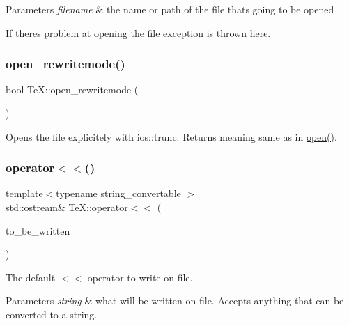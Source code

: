 \begin{DoxyParams}{Parameters}
{\em filename} & the name or path of the file that\textquotesingle{}s going to be opened\\
\hline
\end{DoxyParams}
If there\textquotesingle{}s problem at opening the file exception is thrown here. \mbox{\label{class_te_x_abcc58201c7ea70c660e22aa633be2c3a}} 
\subsubsection{\texorpdfstring{open\+\_\+rewritemode()}{open\_rewritemode()}}
{\footnotesize\ttfamily bool Te\+X\+::open\+\_\+rewritemode (\begin{DoxyParamCaption}{ }\end{DoxyParamCaption})}

Opens the file explicitely with ios\+::trunc. Returns meaning same as in \hyperlink{class_te_x_a742040deabcc5e71e314a3e3cf7deaa6}{open()}. \mbox{\label{class_te_x_ad82a6fa685379180ba717d341295b89c}} 
\subsubsection{\texorpdfstring{operator$<$$<$()}{operator<<()}}
{\footnotesize\ttfamily template$<$typename string\+\_\+convertable $>$ \\
std\+::ostream\& Te\+X\+::operator$<$$<$ (\begin{DoxyParamCaption}\item[{const string\+\_\+convertable}]{to\+\_\+be\+\_\+written }\end{DoxyParamCaption})\hspace{0.3cm}{\ttfamily [inline]}}

The default $<$$<$ operator to write on file. 
\begin{DoxyParams}{Parameters}
{\em string} & what will be written on file. Accepts anything that can be converted to a string. \\
\hline
\end{DoxyParams}
\mbox{\label{class_te_x_a788c3b484fdcc4797915044b9c6e67aa}} 
